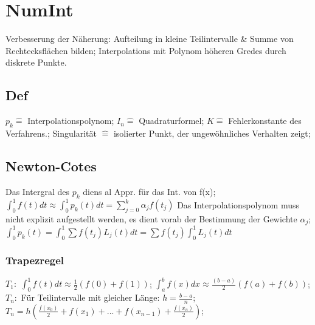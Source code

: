 \section{NumInt}
Verbesserung der Näherung: Aufteilung in kleine Teilintervalle \& Summe von Rechtecksflächen bilden; Interpolations mit Polynom höheren Gredes durch diskrete Punkte.
\subsection{Def}
$ p_{k} \hat{=} $ Interpolationspolynom; 
$ I_{n} \hat{=} $ Quadraturformel; 
$ K \hat{=} $ Fehlerkonstante des Verfahrens.; 
Singularität $\hat{=}$ isolierter Punkt, der ungewöhnliches Verhalten zeigt; 

\subsection{Newton-Cotes}
Das Intergral des $ p_{k} $ diens al Appr. für das Int. von f(x); 
$ \int_{0}^{1} f(t) dt \approx \int_{0}^{1} p_{k} (t) dt =  \sum_{j=0}^{k} \alpha_j f( t_{j} ) $ Das Interpolationspolynom muss nicht explizit aufgestellt werden, es dient vorab der Bestimmung der Gewichte $ \alpha_{j} $; 
$ \int_{0}^{1} p_{k}(t) = \int_{0}^{1} \sum f( t_{j} ) L_{j} (t) dt = \sum f ( t_{j} ) \int_{0}^{1} L_{j} (t) dt $
\subsubsection{Trapezregel}
$ T_{1}: $ 
$ \int_{0}^{1} f (t) dt \approx \frac{1}{2} ( f(0) + f(1) ) $; 
$ \int_{a}^{b} f (x) dx \approx \frac{(b-a)}{2} (f(a) + f(b) ) $;\\
$ T_{n}: $
Für Teilintervalle mit gleicher Länge: $ h = \frac{b-a}{n} $;  
$ T_{n} = h (\frac{ f ( x_{0} ) }{2} + f(x_{1}) + ... + f(x_{n-1}) + \frac{ f(x_n) }{2} ) $; 
